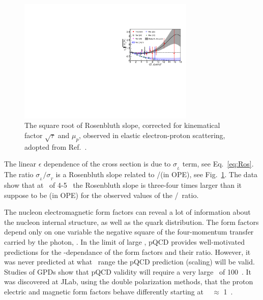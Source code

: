\begin{figure}[h]
\includegraphics[trim = 0mm 0mm 0mm 40mm, width = 0.75\textwidth]{Plots/Fig1.pdf}
\caption{The square root of Rosenbluth slope, corrected for kinematical factor $\sqrt {\tau}$ and $\mu_p$, observed in elastic electron-proton scattering,
adopted from Ref.~\cite{Christy2020ab}.}
\label{pic:Fig1}
\end{figure}

The linear $\epsilon$ dependence of the cross section is due to $\sigma_{_L}$ term, see Eq.~\ref{eq:Ros}.
The ratio $\sigma_{_L}/\sigma_{_T}$ is a Rosenbluth slope related to \gef/\gmf (in OPE), see Fig.~\ref{pic:Fig1}.
The data show that at \qsq~of 4-5 \gevcsq~the Rosenbluth slope is three-four times larger than it suppose to be (in OPE) for
the observed values of the \gep/\gmp~ratio.

%
The nucleon electromagnetic form factors can reveal a lot of information about the nucleon internal structure, as well as the quark distribution. 
The form factors depend only on one variable the negative square of the four-momentum transfer carried by the photon, \qsq. 
In the limit of large \qsq, pQCD provides well-motivated predictions for the \qsq-dependance of the form factors and their ratio. 
However, it was never predicted at what \qsq~range the pQCD prediction (scaling) will be valid.
Studies of GPDs show that pQCD validity will require a very large \qsq~of 100~\gevcsq. 
It was discovered at JLab, using the double polarization methods, that the proton electric and magnetic form factors behave differently starting at \qsq~ $\approx$ 1~\gevcsq.
 
